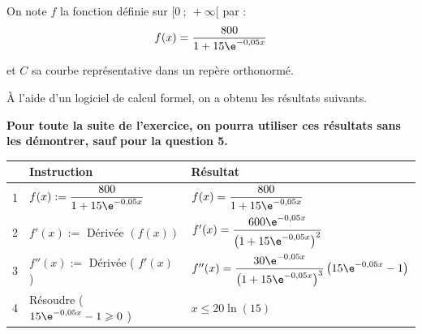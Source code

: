	On note $f$ la fonction définie sur $[0 ~;~ +\infty[$ par :
	$$
	f(x)=\dfrac{800}{1+15 \e^{-0,05 x}}
	$$

	et $C$ sa courbe représentative dans un repère orthonormé.

	\medskip

	À l'aide d'un logiciel de calcul formel, on a obtenu les résultats suivants.

	\textbf{Pour toute la suite de l'exercice, on pourra utiliser ces résultats sans les démontrer, sauf pour la question 5.}

	\begin{center}
	\renewcommand{\arraystretch}{2.5}
\begin{tabularx}{\linewidth}{|l|l|>{\centering \arraybackslash}X|} 
\hline
  & Instruction & Résultat \\	
\hline
1 & $f(x):=\dfrac{800}{1+15 \e^{-0,05 x}}$	& $f(x)=\dfrac{800}{1+15 \e^{-0,05 x}}$  \\	
\hline
2 & $f'(x):=$ Dérivée $(f(x))$ & $f'(x)=\dfrac{600 \e^{-0,05 x}}{\left(1+15 \e^{-0,05 x}\right)^{2}}$ \\ 
\hline
3 & $f''(x):=$ Dérivée ( $f'(x)$ ) & $f''(x)=\dfrac{30 \e^{-0,05 x}}{\left(1+15 \e^{-0,05 x}\right)^{3}}\left(15 \e^{-0,05 x}-1\right)$ \\ 
\hline
4 & Résoudre ( $15 \e^{-0,05 x}-1 \geqslant 0$ )  & $x \leqslant 20 \ln (15)$  \\		
\hline
\end{tabularx}
\renewcommand{\arraystretch}{1}













	\end{center}


